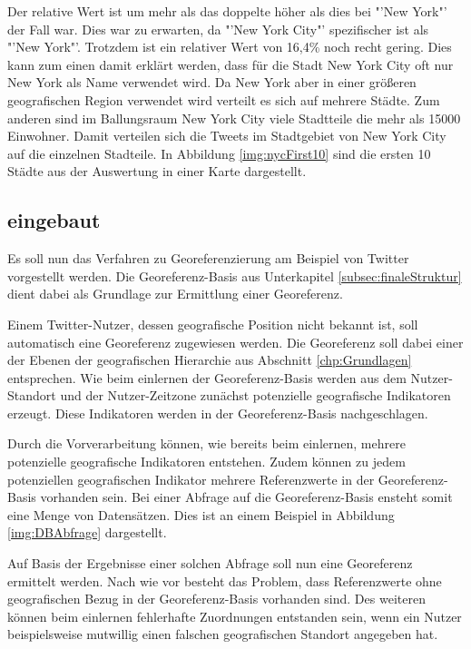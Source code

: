 				Der relative Wert ist um mehr als das doppelte höher als dies bei "'New York"' der Fall war.			
				Dies war zu erwarten, da "'New York City"' spezifischer ist als "'New York"'.
				Trotzdem ist ein relativer Wert von 16,4\% noch recht gering.
				Dies kann zum einen damit erklärt werden, dass für die Stadt New York City oft nur New York als Name verwendet wird. 
				Da New York aber in einer größeren geografischen Region verwendet wird verteilt es sich auf mehrere Städte.
				Zum anderen sind im Ballungsraum New York City viele Stadtteile die mehr als 15000 Einwohner.
				Damit verteilen sich die Tweets im Stadtgebiet von New York City auf die einzelnen Stadteile. 
				In Abbildung \ref{img:nycFirst10} sind die ersten 10 Städte aus der Auswertung in einer Karte dargestellt.

		\subsection{eingebaut}

			 


		Es soll nun das Verfahren zu Georeferenzierung am Beispiel von Twitter vorgestellt werden.
		Die Georeferenz-Basis aus Unterkapitel \ref{subsec:finaleStruktur} dient dabei als Grundlage zur Ermittlung einer Georeferenz.

		Einem Twitter-Nutzer, dessen geografische Position nicht bekannt ist, soll automatisch eine Georeferenz zugewiesen werden.
		Die Georeferenz soll dabei einer der Ebenen der geografischen Hierarchie aus Abschnitt \ref{chp:Grundlagen} entsprechen. 
		Wie beim einlernen der Georeferenz-Basis werden aus dem Nutzer-Standort und der Nutzer-Zeitzone zunächst potenzielle geografische Indikatoren erzeugt.
		Diese Indikatoren werden in der Georeferenz-Basis nachgeschlagen.

		Durch die Vorverarbeitung können, wie bereits beim einlernen, mehrere potenzielle geografische Indikatoren entstehen. 
		Zudem können zu jedem potenziellen geografischen Indikator mehrere Referenzwerte in der Georeferenz-Basis vorhanden sein.
		Bei einer Abfrage auf die Georeferenz-Basis ensteht somit eine Menge von Datensätzen.
		Dies ist an einem Beispiel in Abbildung \ref{img:DBAbfrage} dargestellt.

		Auf Basis der Ergebnisse einer solchen Abfrage soll nun eine Georeferenz ermittelt werden. 
		Nach wie vor besteht das Problem, dass Referenzwerte ohne geografischen Bezug in der Georeferenz-Basis vorhanden sind.
		Des weiteren können beim einlernen fehlerhafte Zuordnungen entstanden sein, wenn ein Nutzer beispielsweise mutwillig einen falschen geografischen Standort angegeben hat. 

